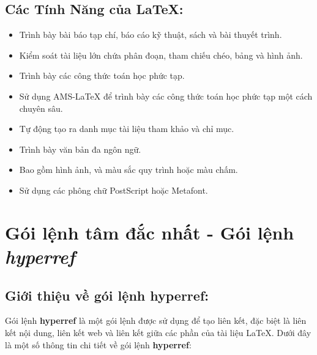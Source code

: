 \documentclass[a4paper,12pt]{article}
\begin{document}
\subsection*{Các Tính Năng của \LaTeX:}
\begin{itemize}
    \item Trình bày bài báo tạp chí, báo cáo kỹ thuật, sách và bài thuyết trình.
    \item Kiểm soát tài liệu lớn chứa phân đoạn, tham chiếu chéo, bảng và hình ảnh.
    \item Trình bày các công thức toán học phức tạp.
    \item Sử dụng AMS-LaTeX để trình bày các công thức toán học phức tạp một cách chuyên sâu.
    \item Tự động tạo ra danh mục tài liệu tham khảo và chỉ mục.
    \item Trình bày văn bản đa ngôn ngữ.
    \item Bao gồm hình ảnh, và màu sắc quy trình hoặc màu chấm.
    \item Sử dụng các phông chữ PostScript hoặc Metafont.	
\end{itemize}


\section{Gói lệnh tâm đắc nhất - Gói lệnh \emph{hyperref}}

\subsection*{Giới thiệu về gói lệnh \textbf{hyperref}:}
Gói lệnh \textbf{hyperref}{} là một gói lệnh được sử dụng để tạo liên kết, đặc biệt là liên kết nội dung, liên kết web và liên kết giữa các phần của tài liệu \LaTeX. Dưới đây là một số thông tin chi tiết về gói lệnh \textbf{hyperref}:
\end{document}
